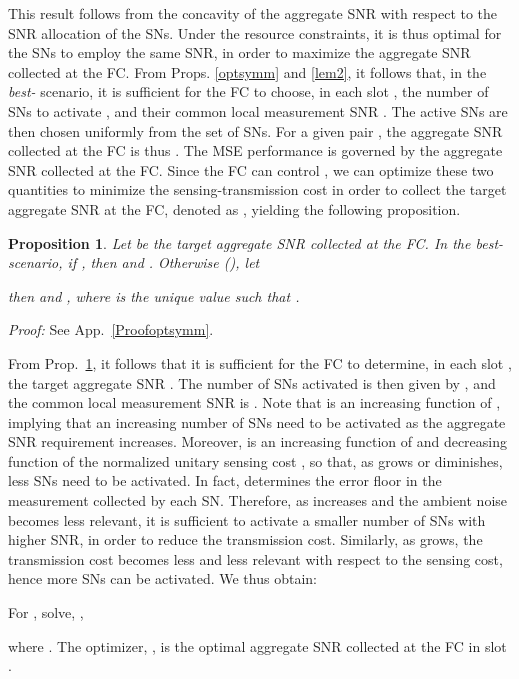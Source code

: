 \documentclass[10pt,twocolumn,twoside]{IEEEtran}
\newtheorem{propos}{Proposition}
\theoremstyle{plain}
\begin{document}
\noindent
This result follows from the concavity of the aggregate SNR with respect to the SNR allocation of the SNs.
Under the resource constraints, it is thus optimal for the SNs to employ the same SNR, in order to maximize the aggregate SNR collected at the FC.
 From Props. \ref{optsymm} and \ref{lem2}, it follows that, in the \emph{best-} scenario, it is sufficient for the FC to choose, in each slot ,
the number of SNs to activate , and their common local measurement SNR . The  active SNs
are then chosen uniformly from the set of SNs.
For a given pair ,
the aggregate SNR collected at the FC is thus .
The MSE performance is governed by the aggregate SNR  collected at the FC. Since the FC 
can control , we can optimize these two quantities to minimize the sensing-transmission cost
in order to collect the target aggregate SNR  at the FC,
denoted as ,
 yielding the following proposition.
\begin{propos}
\label{lem3}
Let  be the target aggregate SNR collected at the FC.
In the \emph{best-} scenario,
if , then  and .
Otherwise (), let

then 
and , where  is the unique value such that .
\end{propos}
\noindent\emph{Proof:}
See App.~\ref{Proofoptsymm}.
\hfill\QED

\noindent From Prop.~\ref{lem3}, it follows that it is sufficient for the FC to determine, in each slot ,
the target aggregate SNR . The number of SNs activated is then given by ,
 and the common local measurement SNR is .
  Note that  is an increasing function of , implying that an increasing number of SNs need to be activated 
as the aggregate SNR requirement  increases.
Moreover,  is an increasing function of  
and decreasing function of the normalized unitary sensing cost , so that, as  grows or  diminishes,
less SNs need to be activated.
In fact,  determines the error floor in the measurement collected by each SN. 
Therefore, as  increases and the ambient noise becomes less relevant, it is sufficient to activate 
a smaller number of SNs with higher SNR, in order to reduce the transmission cost.
Similarly, as  grows, the
transmission cost becomes less and less relevant with respect to the sensing cost, hence
more SNs can be activated.
We thus obtain:

 For , solve, ,
  
where . The optimizer, , is the optimal aggregate SNR collected at the FC in slot .
\hfill\QED
\end{document}
